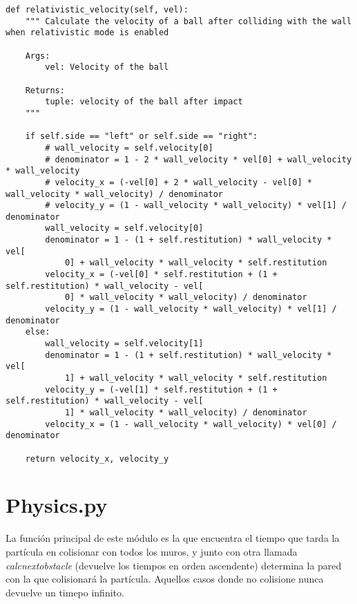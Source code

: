 \begin{lstlisting}[breaklines]
def relativistic_velocity(self, vel):
    """ Calculate the velocity of a ball after colliding with the wall when relativistic mode is enabled

    Args:
        vel: Velocity of the ball

    Returns:
        tuple: velocity of the ball after impact
    """

    if self.side == "left" or self.side == "right":
        # wall_velocity = self.velocity[0]
        # denominator = 1 - 2 * wall_velocity * vel[0] + wall_velocity * wall_velocity
        # velocity_x = (-vel[0] + 2 * wall_velocity - vel[0] * wall_velocity * wall_velocity) / denominator
        # velocity_y = (1 - wall_velocity * wall_velocity) * vel[1] / denominator
        wall_velocity = self.velocity[0]
        denominator = 1 - (1 + self.restitution) * wall_velocity * vel[
            0] + wall_velocity * wall_velocity * self.restitution
        velocity_x = (-vel[0] * self.restitution + (1 + self.restitution) * wall_velocity - vel[
            0] * wall_velocity * wall_velocity) / denominator
        velocity_y = (1 - wall_velocity * wall_velocity) * vel[1] / denominator
    else:
        wall_velocity = self.velocity[1]
        denominator = 1 - (1 + self.restitution) * wall_velocity * vel[
            1] + wall_velocity * wall_velocity * self.restitution
        velocity_y = (-vel[1] * self.restitution + (1 + self.restitution) * wall_velocity - vel[
            1] * wall_velocity * wall_velocity) / denominator
        velocity_x = (1 - wall_velocity * wall_velocity) * vel[0] / denominator

    return velocity_x, velocity_y
\end{lstlisting}

\section*{Physics.py}

La función principal de este módulo es la que encuentra el tiempo que tarda la partícula en colisionar con todos los muros, y junto con otra llamada \textit{calc\textunderscore next\textunderscore obstacle} (devuelve los tiempos en orden ascendente) determina la pared con la que colisionará la partícula. Aquellos casos donde no colisione nunca devuelve un timepo infinito.

